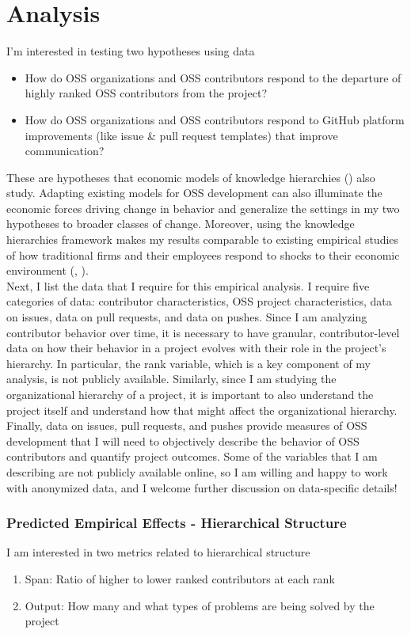 \documentclass[12pt,notitlepage]{article}
\begin{document}
\section*{Analysis}
I'm interested in testing two hypotheses using data
\begin{itemize}
    \item How do OSS organizations and OSS contributors respond to the departure of highly ranked OSS contributors from the project?
    \item How do OSS organizations and OSS contributors respond to GitHub platform improvements (like issue \& pull request templates) that improve communication?
\end{itemize}
These are hypotheses that economic models of knowledge hierarchies (\cite{garicano_hierarchies_2000}) also study. Adapting existing models for OSS development can also illuminate the economic forces driving change in behavior and generalize the settings in my two hypotheses to broader classes of change. Moreover, using the knowledge hierarchies framework makes my results comparable to existing empirical studies of how traditional firms and their employees respond to shocks to their economic environment (\cite{garicano_hierarchies_2012}, \cite{bloom_distinct_2014}). \\


Next, I list the data that I require for this empirical analysis. I require five categories of data: contributor characteristics, OSS project characteristics, data on issues, data on pull requests, and data on pushes. Since I am analyzing contributor behavior over time, it is necessary to have granular, contributor-level data on how their behavior in a project evolves with their role in the project's hierarchy. In particular, the rank variable, which is a key component of my analysis, is not publicly available. Similarly, since I am studying the organizational hierarchy of a project, it is important to also understand the project itself and understand how that might affect the organizational hierarchy. Finally, data on issues, pull requests, and pushes provide measures of OSS development that I will need to objectively describe the behavior of OSS contributors and quantify project outcomes. Some of the variables that I am describing are not publicly available online, so I am willing and happy to work with anonymized data, and I welcome further discussion on data-specific details!  



\iffalse
\subsubsection{Predicted Empirical Effects - Hierarchical Structure}
I am interested in two metrics related to hierarchical structure
\begin{enumerate}
    \item Span: Ratio of higher to lower ranked contributors at each rank  
    \item Output: How many and what types of problems are being solved by the project
\end{enumerate}
\end{document}
